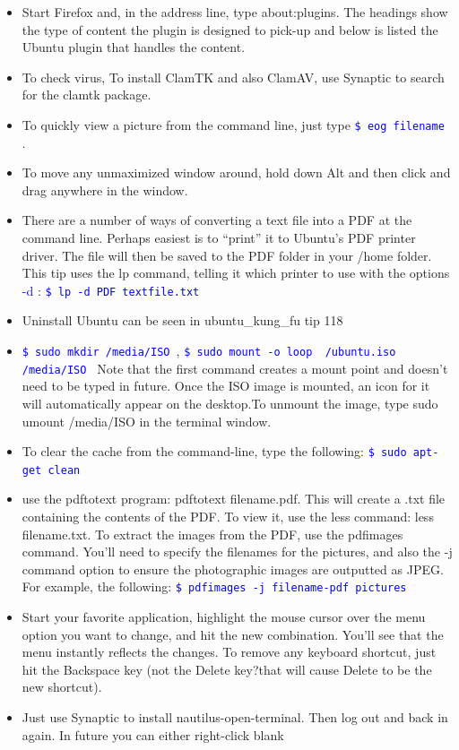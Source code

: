 \documentclass[a4paper,12pt,twoside]{book}
\newcommand{\linuxcommand}[1]{\texttt{\textcolor{blue}{\$ #1 \Pisymbol{psy}{191}}}}
\newcommand{\op}[1]{\textcolor{blue}{-#1}}
\begin{document}
\begin{CJK*}{UTF8}{song}
\begin{itemize}
		\item Start Firefox and, in the address line, type about:plugins. The headings show the type of content the plugin is designed to pick-up and below is listed the Ubuntu plugin that handles the content.
		\item To check virus, To install ClamTK and also ClamAV, use Synaptic to search for the clamtk package.
		\item To quickly view a picture from the command line, just type \linuxcommand{eog filename}.
		\item To move any unmaximized window around, hold down Alt and then click and drag anywhere in the window.
		\item There are a number of ways of converting a text file into a PDF at the command line. Perhaps easiest is to ``print'' it to Ubuntu's PDF printer driver. The file will then be saved to the PDF folder in your /home folder. This tip uses the lp command, telling it which printer to use with the options \op{d} : \linuxcommand{lp -d PDF textfile.txt}
		\item Uninstall Ubuntu can be seen in ubuntu\_kung\_fu tip 118
		\item \linuxcommand{sudo mkdir /media/ISO }, \linuxcommand{sudo mount -o loop ~/ubuntu.iso /media/ISO}
		Note that the first command creates a mount point and doesn't need to be typed in future. Once the ISO image is mounted, an icon for it will automatically appear on the desktop.To unmount the image, type sudo umount /media/ISO in the terminal window.
		\item To clear the cache from the command-line, type the following: \linuxcommand{sudo apt-get clean}
		\item use the pdftotext program: pdftotext filename.pdf. This will create a .txt file containing the contents of the PDF. To view it, use the less command: less filename.txt. To extract the images from the PDF, use the pdfimages command. You'll need to specify the filenames for the pictures, and also the -j command option to ensure the photographic images are outputted as JPEG. For example, the following: \linuxcommand{pdfimages -j filename-pdf pictures}
		\item Start your favorite application, highlight the mouse cursor over the menu option you want to change, and hit the new
		combination. You'll see that the menu instantly reflects the changes. To remove any keyboard shortcut, just hit the Backspace key
		(not the Delete key?that will cause Delete to be the new shortcut).
		\item Just use Synaptic to install nautilus-open-terminal. Then log out and back in again. In future you can either right-click blank

\end{itemize}
\end{CJK*}
\end{document}
